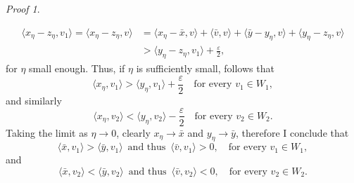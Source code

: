 \documentclass[11pt,twoside,a4paper]{article}
\newcommand{\scal}[2]{\ensuremath{\langle #1 , #2 \rangle}} %
\newcommand{\thmsymbol}{\( \square \)}
\theoremstyle{theorem}
\theoremstyle{definition}
\theoremstyle{remark}
\theoremstyle{proof}
\newtheorem*{pro}{Proof}
\newenvironment{pr}{\begin{pro}%
 \renewcommand{\qedsymbol}{\thmsymbol}\pushQED{\qed}}%
 {\popQED\end{pro}}
\begin{document}
\begin{pr}
\begin{itemize}
    \begin{align*}
        \scal{x_\eta- z_\eta}{v_1} = \scal{x_\eta- z_\eta}{v} &= \scal{x_\eta- \bar x}{v}+ \scal{\bar v}{v}+ \scal{\bar y- y_\eta}{v}+ \scal{y_\eta- z_\eta}{v}\\
        &> \scal{y_\eta- z_\eta}{v_1} +\frac \varepsilon 2,
    \end{align*}
    for $\eta$ small enough. Thus, if $\eta$ is sufficiently small, follows that 
    \begin{equation*}
        \scal{x_\eta}{v_1} > \scal{y_\eta}{v_1} +\frac \varepsilon 2 \quad \text{for every } v_1 \in W_1,
    \end{equation*}
    and similarly 
    \begin{equation*}
        \scal{x_\eta}{v_2} < \scal{y_\eta}{v_2} - \frac \varepsilon 2 \quad \text{for every } v_2 \in W_2.
    \end{equation*}
    Taking the limit as $\eta \to 0$, clearly $x_\eta \to \bar x$ and $y_\eta \to \bar y$, therefore I conclude that 
     \begin{equation}\label{eq:V1}
        \scal{\bar x}{v_1} > \scal{\bar y}{v_1} \, \text{ and thus } \, \scal{\bar v}{v_1}>0,  \quad \text{for every } v_1 \in W_1,
    \end{equation}
    and 
    \begin{equation}\label{eq:V2}
        \scal{\bar x}{v_2} < \scal{\bar y}{v_2} \, \text{ and thus } \, \scal{\bar v}{v_2}<0, \quad \text{for every } v_2 \in W_2.
    \end{equation}
    

\end{itemize}
\end{pr}
\end{document}
